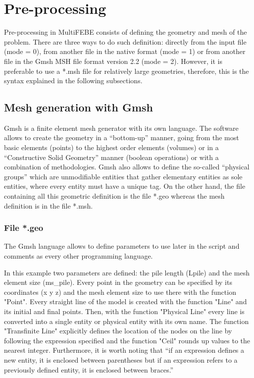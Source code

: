 \documentclass[a4]{article}
\begin{document}
\section{Pre-processing} 
Pre-processing in MultiFEBE consists of defining the geometry and mesh of the problem. There are three ways to do such definition: directly from the input file (mode = 0), from another file in the native format (mode = 1) or from another file in the Gmsh MSH file format version 2.2 (mode = 2). However, it is preferable to use a *.msh file for relatively large geometries, therefore, this is the syntax explained in the following subsections.
   
\subsection{Mesh generation with Gmsh}
Gmsh \cite{gmsh, gmshweb} is a finite element mesh generator with its own language. The software allows to create the geometry in a “bottom-up” manner, going from the most basic elements (points) to the highest order elements (volumes) or in a “Constructive Solid Geometry” manner (boolean operations) or with a combination of methodologies. Gmsh also allows to define  the so-called “physical groups” which are unmodifiable entities that gather elementary entities as sole entities, where every entity must have a unique tag. On the other hand, the file containing all this geometric definition is the file *.geo whereas the mesh definition is in the file *.msh. 

\subsubsection{File *.geo}
The Gmsh language allows to define parameters to use later in the script and comments as every other programming language. 

In this example two parameters are defined: the pile length (Lpile) and the mesh element size (ms\_pile). Every point in the geometry can be specified by its coordinates (x y z) and the mesh element size to use there with the function "Point". Every straight line of the model is created with the function "Line" and its initial and final points. Then, with the function "Physical Line" every line is converted into a single entity or physical entity with its own name. The function "Transfinite Line" explicitly defines the location of the nodes on the line by following the expression specified and the function "Ceil" rounds up values to the nearest integer. Furthermore, it is worth noting that “if an expression defines a new entity, it is enclosed between parentheses but if an expression refers to a previously defined entity, it is enclosed between braces.” \cite{gmshweb}
\end{document}
